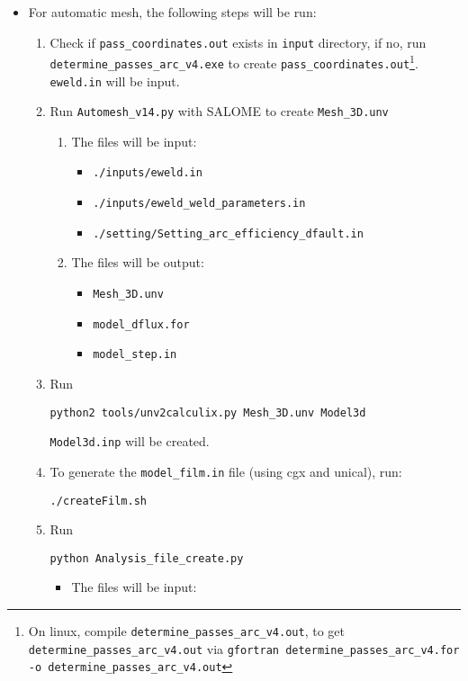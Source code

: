 \documentclass[12pt,letterpaper]{article}
\newcommand{\verbStyle}[1]{{\color{SteelBlue40}\colorbox{LightSteelBlue10}{{#1}}}}
\let\OldTexttt\texttt
\renewcommand{\texttt}[1]{\OldTexttt{\verbStyle{#1}}}
\begin{document}
\begin{itemize}
\item For automatic mesh, the following steps will be run:
\begin{enumerate}
\item Check if \texttt{pass\_coordinates.out} exists in \texttt{input} directory, if no, run \\
\texttt{determine\_passes\_arc\_v4.exe} to create \texttt{pass\_coordinates.out}\footnote{On linux, compile      \texttt{determine\_passes\_arc\_v4.out}, to get \texttt{determine\_passes\_arc\_v4.out} via \texttt{gfortran determine\_passes\_arc\_v4.for -o determine\_passes\_arc\_v4.out}}. 
\texttt{eweld.in} will be input.
\item Run \texttt{Automesh\_v14.py} with SALOME to create \texttt{Mesh\_3D.unv}
\begin{enumerate}
\item The files will be input:
\begin{itemize}
\item \texttt{./inputs/eweld.in}
\item \texttt{./inputs/eweld\_weld\_parameters.in}
\item \texttt{./setting/Setting\_arc\_efficiency\_dfault.in}
\end{itemize}
\item The files will be output: 
\begin{itemize}
\item \texttt{Mesh\_3D.unv}
\item \texttt{model\_dflux.for}
\item \texttt{model\_step.in}
\end{itemize}
\end{enumerate}
\item Run 
\begin{verbatim}
python2 tools/unv2calculix.py Mesh_3D.unv Model3d
\end{verbatim}
\texttt{Model3d.inp} will be created.
\item To generate the \texttt{model\_film.in} file (using cgx and unical), run:
\begin{verbatim}
./createFilm.sh
\end{verbatim}
\item Run 
\begin{verbatim}
python Analysis_file_create.py
\end{verbatim}
\begin{itemize}
\item The files will be input:
\begin{itemize}

\end{itemize}
\end{itemize}
\end{enumerate}
\end{itemize}
\end{document}
